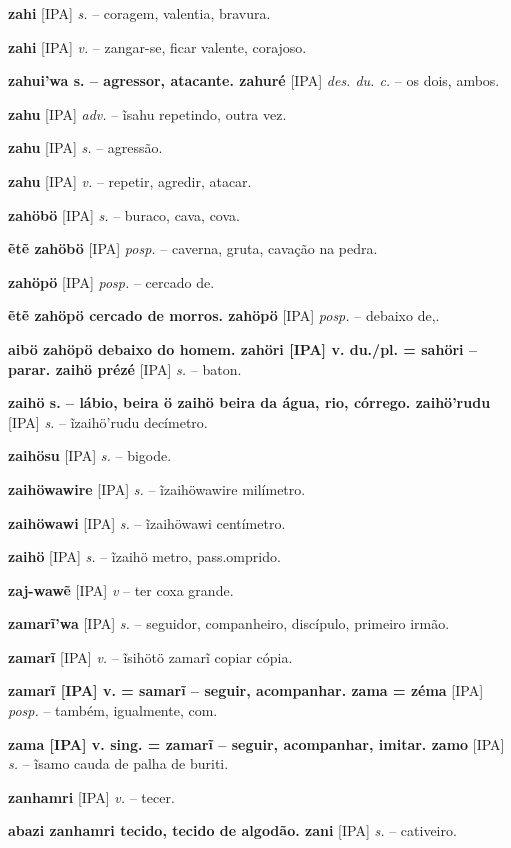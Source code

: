 {{{{{\textbf{zahi} [IPA] \textit{s.} -- coragem, valentia, bravura.

\textbf{zahi} [IPA] \textit{v.} -- zangar-se, ficar valente, corajoso.

\textbf{zahui'wa s. -- agressor, atacante. zahuré} [IPA] \textit{des. du. c.} -- os dois, ambos.

\textbf{zahu} [IPA] \textit{adv.} -- ĩsahu repetindo, outra vez.

\textbf{zahu} [IPA] \textit{s.} -- agressão.

\textbf{zahu} [IPA] \textit{v.} -- repetir, agredir, atacar.

\textbf{zahöbö} [IPA] \textit{s.} -- buraco, cava, cova.

\textbf{ẽtẽ zahöbö} [IPA] \textit{posp.} -- caverna, gruta, cavação na pedra.

\textbf{zahöpö} [IPA] \textit{posp.} -- cercado de.

\textbf{ẽtẽ zahöpö cercado de morros. zahöpö} [IPA] \textit{posp.} -- debaixo de,.

\textbf{aibö zahöpö debaixo do homem. zahöri [IPA] v. du./pl. = sahöri -- parar. zaihö prézé} [IPA] \textit{s.} -- baton.

\textbf{zaihö s. -- lábio, beira  ö zaihö beira da água, rio, córrego. zaihö'rudu} [IPA] \textit{s.} -- ĩzaihö'rudu decímetro.

\textbf{zaihösu} [IPA] \textit{s.} -- bigode.

\textbf{zaihöwawire} [IPA] \textit{s.} -- ĩzaihöwawire milímetro.

\textbf{zaihöwawi} [IPA] \textit{s.} -- ĩzaihöwawi centímetro.

\textbf{zaihö} [IPA] \textit{s.} -- ĩzaihö metro, pass.omprido.

\textbf{zaj-wawẽ} [IPA] \textit{v} -- {ter coxa grande}.

\textbf{zamarĩ'wa} [IPA] \textit{s.} -- seguidor, companheiro, discípulo, primeiro irmão.

\textbf{zamarĩ} [IPA] \textit{v.} -- ĩsihötö zamarĩ copiar  cópia.

\textbf{zamarĩ [IPA] v. = samarĩ -- seguir, acompanhar. zama = zéma} [IPA] \textit{posp.} -- também, igualmente, com.

\textbf{zama [IPA] v. sing. = zamarĩ -- seguir, acompanhar, imitar. zamo} [IPA] \textit{s.} -- ĩsamo cauda de palha de buriti.

\textbf{zanhamri} [IPA] \textit{v.} -- tecer.

\textbf{abazi zanhamri tecido, tecido de algodão. zani} [IPA] \textit{s.} -- cativeiro.

}}}}}
